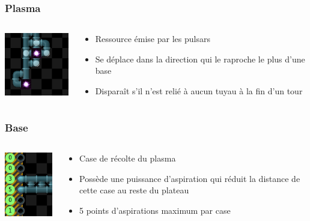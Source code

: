 \documentclass{beamer}
\begin{document}
\begin{frame}
	\frametitle{Plasma}
    \begin{columns}[T]
        \begin{column}{.3\textwidth}
            \includegraphics[width=3cm]{pictures/emission}
        \end{column}
        \begin{column}{.7\textwidth}
            \begin{itemize}
                \item Ressource émise par les pulsars
                \item Se déplace dans la direction qui le raproche le plus d'une base
                \item Disparaît s'il n'est relié à aucun tuyau à la fin d'un tour
            \end{itemize}
        \end{column}
    \end{columns}
\end{frame}

\begin{frame}
	\frametitle{Base}
    \begin{columns}[T]
        \begin{column}{.3\textwidth}
            \includegraphics[width=3cm]{pictures/aspiration}
        \end{column}
        \begin{column}{.7\textwidth}
            \begin{itemize}
                \item Case de récolte du plasma
                \item Possède une puissance d'aspiration qui réduit la distance de cette case au reste du plateau
                \item 5 points d'aspirations maximum par case
            \end{itemize}
        \end{column}
    \end{columns}
\end{frame}
\end{document}
